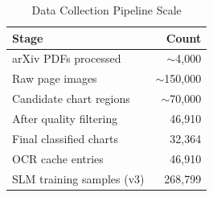 \begin{table}[htbp]
\centering
\caption{Data Collection Pipeline Scale}
\label{tab:data-pipeline-scale}
\begin{tabular}{@{}lr@{}}
\toprule
\textbf{Stage} & \textbf{Count} \\
\midrule
arXiv PDFs processed      &  $\sim$4,000 \\
Raw page images           & $\sim$150,000 \\
Candidate chart regions   &  $\sim$70,000 \\
After quality filtering   &     46,910 \\
Final classified charts   &     32,364 \\
OCR cache entries         &     46,910 \\
SLM training samples (v3) &    268,799 \\
\bottomrule
\end{tabular}
\end{table}